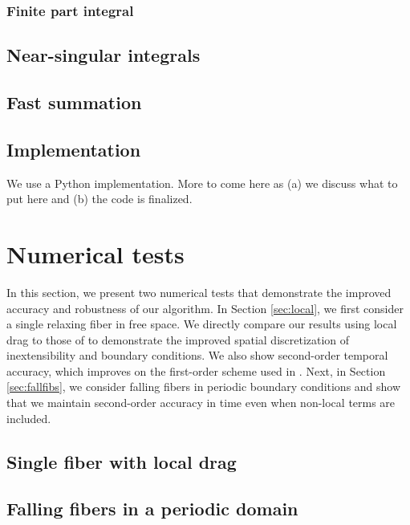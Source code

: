 \documentclass[12pt]{article}
\newcommand{\cmt}[1]{\color{blue}#1\normalcolor}
\begin{document}
\subsubsection{Finite part integral \label{sec:tornFP}}


\subsection{Near-singular integrals \label{sec:specquad}}



\subsection{Fast summation \label{sec:ewald}}



\subsection{Implementation}
We use a Python implementation. \cmt{More to come here as (a) we discuss what to put here and (b) the code is finalized}. 

\section{Numerical tests}
In this section, we present two numerical tests that demonstrate the improved accuracy and robustness of our algorithm. In Section \ref{sec:local}, we first consider a single relaxing fiber in free space. We directly compare our results using local drag to those of \cite{ehssan17} to demonstrate the improved spatial discretization of inextensibility and boundary conditions. We also show second-order temporal accuracy, which improves on the first-order scheme used in \cite{ehssan17}. Next, in Section \ref{sec:fallfibs}, we consider falling fibers in periodic boundary conditions and show that we maintain second-order accuracy in time even when non-local terms are included. 

\subsection{Single fiber with local drag \label{sec:local}}


\subsection{Falling fibers in a periodic domain \label{sec:fallfibs}}
\end{document}
